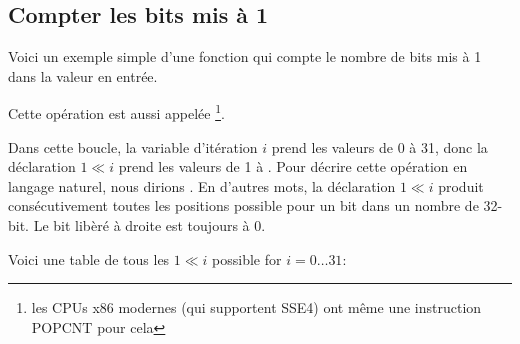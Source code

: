 ﻿\subsection{Compter les bits mis à 1}

Voici un exemple simple d'une fonction qui compte le nombre de bits mis à 1 dans
la valeur en entrée.

Cette opération est aussi appelée \footnote{les CPUs x86 modernes
(qui supportent SSE4) ont même une instruction POPCNT pour cela}.



Dans cette boucle, la variable d'itération $i$ prend les valeurs de 0 à 31, donc
la déclaration $1 \ll i$ prend les valeurs de 1 à .
Pour décrire cette opération en langage naturel, nous dirions .
En d'autres mots, la déclaration $1 \ll i$ produit consécutivement toutes les positions
possible pour un bit dans un nombre de 32-bit.
Le bit libèré à droite est toujours à 0.

\label{2n_numbers_table}
Voici une table de tous les $1 \ll i$ possible
for $i=0 \ldots 31$:

